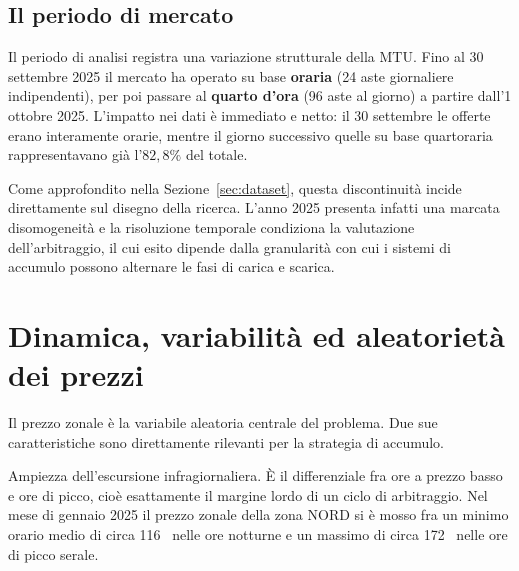 

\subsection{Il periodo di mercato}

Il periodo di analisi registra una variazione strutturale della \acf{MTU}. Fino al 30 settembre 2025 il mercato ha operato su base \textbf{oraria} (24 aste giornaliere indipendenti), per poi passare al \textbf{quarto d'ora} (96 aste al giorno) a partire dall'1 ottobre 2025. L'impatto nei dati è immediato e netto: il 30 settembre le offerte erano interamente orarie, mentre il giorno successivo quelle su base quartoraria rappresentavano già l'$82{,}8\%$ del totale.

Come approfondito nella Sezione~\ref{sec:dataset}, questa discontinuità incide direttamente sul disegno della ricerca. L'anno 2025 presenta infatti una marcata disomogeneità e la risoluzione temporale condiziona la valutazione dell'arbitraggio, il cui esito dipende dalla granularità con cui i sistemi di accumulo possono alternare le fasi di carica e scarica.


\section{Dinamica, variabilità ed aleatorietà dei prezzi}
\label{sec:aleatorieta}

Il prezzo zonale è la variabile aleatoria centrale del problema. Due sue caratteristiche sono direttamente rilevanti per la strategia di accumulo.

Ampiezza dell'escursione infragiornaliera. \`E il differenziale fra ore a prezzo
basso e ore di picco, cio\`e esattamente il margine lordo di un ciclo di arbitraggio. Nel
mese di gennaio 2025 il prezzo zonale della zona NORD si \`e mosso fra un minimo orario medio
di circa 116~\euromwh{} nelle ore notturne e un massimo di circa 172~\euromwh{} nelle ore di
picco serale.

